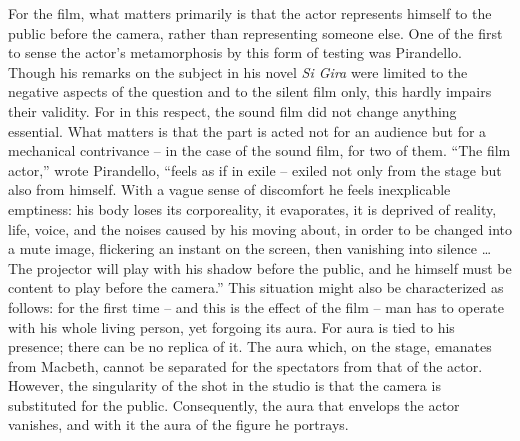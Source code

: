 \documentclass[11pt, letterpaper]{article}
\begin{document}
For the film, what matters primarily is that the actor represents himself to
the public before the camera, rather than representing someone else. One of the
first to sense the actor’s metamorphosis by this form of testing was
Pirandello. Though his remarks on the subject in his novel \textit{Si Gira}
were limited to the negative aspects of the question and to the silent film
only, this hardly impairs their validity. For in this respect, the sound film
did not change anything essential. What matters is that the part is acted not
for an audience but for a mechanical contrivance – in the case of the sound
film, for two of them. “The film actor,” wrote Pirandello, “feels as if in
exile – exiled not only from the stage but also from himself. With a vague
sense of discomfort he feels inexplicable emptiness: his body loses its
corporeality, it evaporates, it is deprived of reality, life, voice, and the
noises caused by his moving about, in order to be changed into a mute image,
flickering an instant on the screen, then vanishing into silence \ldots The
projector will play with his shadow before the public, and he himself must be
content to play before the camera.” This situation might also be characterized
as follows: for the first time – and this is the effect of the film – man has
to operate with his whole living person, yet forgoing its aura. For aura is
tied to his presence; there can be no replica of it. The aura which, on the
stage, emanates from Macbeth, cannot be separated for the spectators from that
of the actor. However, the singularity of the shot in the studio is that the
camera is substituted for the public. Consequently, the aura that envelops the
actor vanishes, and with it the aura of the figure he portrays.
\end{document}
